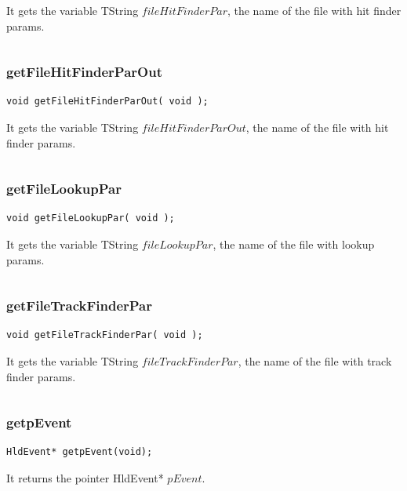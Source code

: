 \documentclass[a4paper]{book}
\begin{document}
It gets the variable TString $fileHitFinderPar$, the name of the file with hit finder params.

\[\]

\subsubsection{getFileHitFinderParOut}

\begin{lstlisting}[style=customc]
void getFileHitFinderParOut( void );
\end{lstlisting}

It gets the variable TString $fileHitFinderParOut$, the name of the file with hit finder params.

\[\]

\subsubsection{getFileLookupPar}

\begin{lstlisting}[style=customc]
void getFileLookupPar( void );
\end{lstlisting}

It gets the variable TString $fileLookupPar$, the name of the file with lookup params.

\[\]

\subsubsection{getFileTrackFinderPar}

\begin{lstlisting}[style=customc]
void getFileTrackFinderPar( void );
\end{lstlisting}

It gets the variable TString $fileTrackFinderPar$, the name of the file with track finder params.

\[\]

\subsubsection{getpEvent}

\begin{lstlisting}[style=customc]
HldEvent* getpEvent(void);
\end{lstlisting}

It returns the pointer HldEvent* $pEvent$.

\[\]
\end{document}
